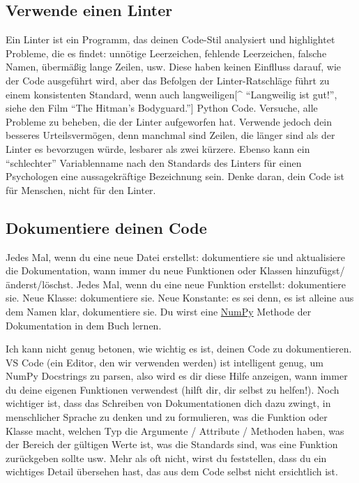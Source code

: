 \documentclass[
]{book}
\begin{document}
\hypertarget{verwende-einen-linter}{%
\subsection{Verwende einen Linter}\label{verwende-einen-linter}}

Ein Linter ist ein Programm, das deinen Code-Stil analysiert und highlightet Probleme, die es findet: unnötige Leerzeichen, fehlende Leerzeichen, falsche Namen, übermäßig lange Zeilen, usw. Diese haben keinen Einflluss darauf, wie der Code ausgeführt wird, aber das Befolgen der Linter-Ratschläge führt zu einem konsistenten Standard, wenn auch langweiligen{[}\^{} ``Langweilig ist gut!'', siehe den Film ``The Hitman's Bodyguard.''{]} Python Code. Versuche, alle Probleme zu beheben, die der Linter aufgeworfen hat. Verwende jedoch dein besseres Urteilsvermögen, denn manchmal sind Zeilen, die länger sind als der Linter es bevorzugen würde, lesbarer als zwei kürzere. Ebenso kann ein ``schlechter'' Variablenname nach den Standards des Linters für einen Psychologen eine aussagekräftige Bezeichnung sein. Denke daran, dein Code ist für Menschen, nicht für den Linter.

\hypertarget{dokumentiere-deinen-code}{%
\subsection{Dokumentiere deinen Code}\label{dokumentiere-deinen-code}}

Jedes Mal, wenn du eine neue Datei erstellst: dokumentiere sie und aktualisiere die Dokumentation, wann immer du neue Funktionen oder Klassen hinzufügst/änderst/löschst. Jedes Mal, wenn du eine neue Funktion erstellst: dokumentiere sie. Neue Klasse: dokumentiere sie. Neue Konstante: es sei denn, es ist alleine aus dem Namen klar, dokumentiere sie. Du wirst eine \href{https://numpydoc.readthedocs.io/en/latest/format.html}{NumPy} Methode der Dokumentation in dem Buch lernen.

Ich kann nicht genug betonen, wie wichtig es ist, deinen Code zu dokumentieren. VS Code (ein Editor, den wir verwenden werden) ist intelligent genug, um NumPy Docstrings zu parsen, also wird es dir diese Hilfe anzeigen, wann immer du deine eigenen Funktionen verwendest (hilft dir, dir selbst zu helfen!). Noch wichtiger ist, dass das Schreiben von Dokumentationen dich dazu zwingt, in menschlicher Sprache zu denken und zu formulieren, was die Funktion oder Klasse macht, welchen Typ die Argumente / Attribute / Methoden haben, was der Bereich der gültigen Werte ist, was die Standards sind, was eine Funktion zurückgeben sollte usw. Mehr als oft nicht, wirst du feststellen, dass du ein wichtiges Detail übersehen hast, das aus dem Code selbst nicht ersichtlich ist.
\end{document}
